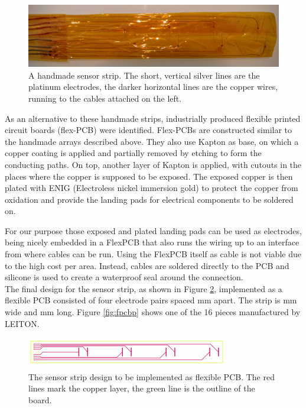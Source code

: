 \begin{figure}[H]
	\begin{center}
		\includegraphics[width=\textwidth]{images/v2.jpg} 
		\caption[A handmade sensor strip.]{A handmade sensor strip. The short, vertical silver lines are the platinum electrodes, the darker horizontal lines are the copper wires, running to the cables attached on the left.}
		\label{fig:v2}
	\end{center}
\end{figure}

As an alternative to these handmade strips, industrially produced flexible printed circuit boards (flex-PCB) were identified. Flex-PCBs are constructed similar to the handmade arrays described above. They also use Kapton as base, on which a copper coating is applied and partially removed by etching to form the conducting paths. On top, another layer of Kapton is applied, with cutouts in the places where the copper is supposed to be exposed. The exposed copper is then plated with ENIG (Electroless nickel immersion gold) to protect the copper from oxidation and provide the landing pads for electrical components to be soldered on.

For our purpose those exposed and plated landing pads can be used as electrodes, being nicely embedded in a FlexPCB that also runs the wiring up to an interface from where cables can be run. Using the FlexPCB itself as cable is not viable due to the high cost per area. Instead, cables are soldered directly to the PCB and silicone is used to create a waterproof seal around the connection.\\

The final design for the sensor strip, as shown in Figure \ref{fig:fpcbd}, implemented as a flexible PCB consisted of four electrode pairs spaced \unit[50]{mm} apart. The strip is \unit[25]{mm} wide and \unit[220]{mm} long. Figure \ref{fig:fpcbp} shows one of the 16 pieces manufactured by LEITON.

\begin{figure}
	\begin{center}
		\includegraphics[width=\textwidth]{images/fpcbd.pdf} 
		\caption[The sensor strip design to be implemented as flexible PCB.]{The sensor strip design to be implemented as flexible PCB. The red lines mark the copper layer, the green line is the outline of the board.}
		\label{fig:fpcbd}
	\end{center}
\end{figure}

